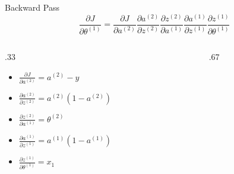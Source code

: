 \documentclass[aspectratio=169, xcolor=dvipsnames]{beamer}
\begin{document}
  \begin{frame}{Backward Pass}
    \[
      \frac{\partial J}{\partial\theta^{(1)}}= \frac{\partial J}{\partial a^{(2)}}
      \frac{\partial a^{(2)}}{\partial z^{(2)}}\frac{\partial z^{(2)}}{\partial
      a^{(1)}}\frac{\partial a^{(1)}}{\partial z^{(1)}}\frac{\partial z^{(1)}}{\partial\theta^{(1)}}
    \]
    \begin{columns}
      \begin{column}{.33\linewidth}
        \begin{itemize}
          \item $\frac{\partial J}{\partial a^{(2)}}=a^{(2)}-y$

          \item $\frac{\partial a^{(2)}}{\partial z^{(2)}}=a^{(2)}(1-a^{(2)})$

          \item<2-> $\frac{\partial z^{(2)}}{\partial a^{(1)}}=\theta^{(2)}$

          \item<3-> $\frac{\partial a^{(1)}}{\partial z^{(1)}}=a^{(1)}(1-a^{(1)})$

          \item<4> $\frac{\partial z^{(1)}}{\partial \theta^{(1)}}=x_{1}$
        \end{itemize}
      \end{column}
      \begin{column}{.67\linewidth}
        \small
\end{column}
\end{columns}
\end{frame}
\end{document}
